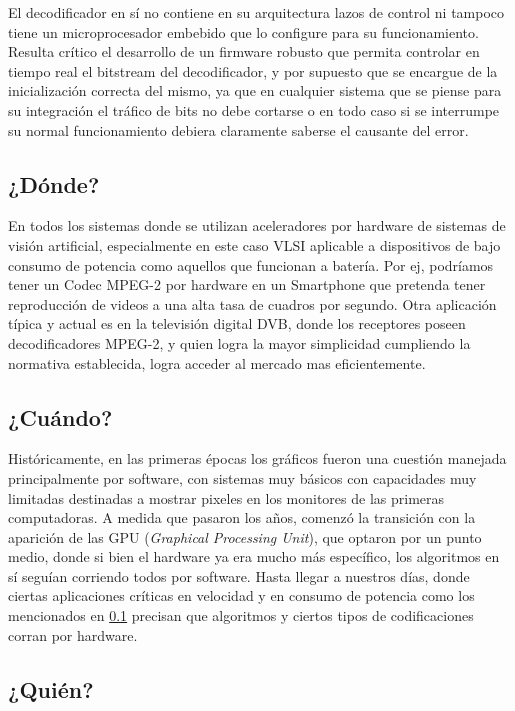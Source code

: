 El decodificador en sí no contiene en su arquitectura lazos de control ni tampoco tiene un microprocesador embebido que lo configure para su funcionamiento. Resulta crítico el desarrollo de un firmware robusto que permita controlar en tiempo real el bitstream del decodificador, y por supuesto que se encargue de la inicialización correcta del mismo, ya que en cualquier sistema que se piense para su integración el tráfico de bits no debe cortarse o en todo caso si se interrumpe su normal funcionamiento debiera claramente saberse el causante del error.

\subsection{¿Dónde?}
\label{sec:donde}

En todos los sistemas donde se utilizan aceleradores por hardware de sistemas de visión artificial, especialmente en este caso VLSI aplicable a dispositivos de bajo consumo de potencia como aquellos que funcionan a batería. Por ej, podríamos tener un Codec MPEG-2 por hardware en un Smartphone que pretenda tener reproducción de videos a una alta tasa de cuadros por segundo. Otra aplicación típica y actual  es en la televisión digital DVB, donde los receptores poseen decodificadores MPEG-2, y quien logra la mayor simplicidad cumpliendo la normativa establecida, logra acceder al mercado mas eficientemente.

\subsection{¿Cuándo?}
\label{sec:cuando}

Históricamente, en las primeras épocas los gráficos fueron una cuestión manejada principalmente por software, con sistemas muy básicos con capacidades muy limitadas destinadas a mostrar pixeles en los monitores de las primeras computadoras. A medida que pasaron los años, comenzó la transición con la aparición de las GPU (\textit{Graphical Processing Unit}), que optaron por un punto medio, donde si bien el hardware ya era mucho más específico, los algoritmos en sí seguían corriendo todos por software. Hasta llegar a nuestros días, donde ciertas aplicaciones críticas en velocidad y en consumo de potencia como los mencionados en \ref{sec:donde} precisan que algoritmos y ciertos tipos de codificaciones corran por hardware.

\subsection{¿Quién?}
\label{sec:quien}

